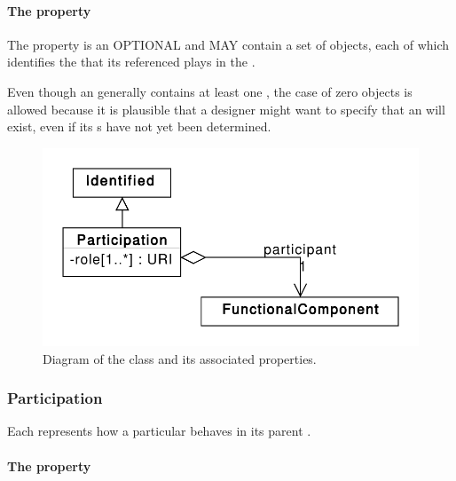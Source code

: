 \paragraph{The  property}\label{sec:participations}

The  property is an OPTIONAL and MAY contain a set of  objects, each of which identifies the  that its referenced  plays in the .

Even though an  generally contains at least one , the case of zero  objects is allowed because it is plausible that a designer might want to specify that an  will exist, even if its s have not yet been determined.

\begin{figure}[ht]
\begin{center}
\includegraphics[scale=0.6]{uml/participation}
\caption[]{Diagram of the  class and its associated properties.}
\label{uml:participation}
\end{center}
\end{figure}

\subsubsection{Participation}
\label{sec:Participation}

Each  represents how a particular  behaves in its parent
.

\paragraph{The  property}\label{sec:roles:P}

